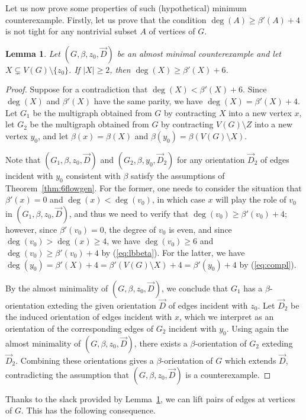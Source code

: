 \documentclass[12pt,twoside,openright,a4paper]{book}
\newtheorem{lemma}[theorem]{Lemma}
\begin{document}
Let us now prove some properties of such (hypothetical) minimum counterexample.  Firstly, let us prove that the condition $\deg(A)\ge \beta'(A)+4$
is not tight for any nontrivial subset $A$ of vertices of $G$.
\begin{lemma}\label{lemma:6fl-nontight}
Let $(G,\beta,z_0,\vec{D})$ be an almost minimal counterexample and let $X\subsetneq V(G)\setminus\{z_0\}$.  If $|X|\ge 2$,
then $\deg(X)\ge \beta'(X)+6$.
\end{lemma}
\begin{proof}
Suppose for a contradiction that $\deg(X)<\beta'(X)+6$.  Since $\deg(X)$ and $\beta'(X)$ have the same parity,
we have $\deg(X)=\beta'(X)+4$. Let $G_1$ be the multigraph obtained from $G$ by contracting $X$ into a new vertex $x$,
let $G_2$ be the multigraph obtained from $G$ by contracting $V(G)\setminus Z$ into a new vertex $y_0$, and let
$\beta(x)=\beta(X)$ and $\beta(y_0)=\beta(V(G)\setminus X)$.

Note that $(G_1,\beta,z_0,\vec{D})$ and $(G_2,\beta,y_0,\vec{D}_2)$ for any orientation $\vec{D}_2$ of edges incident with
$y_0$ consistent with $\beta$ satisfy the assumptions of Theorem~\ref{thm:6flowgen}. For the former, one needs to consider the situation that $\beta'(x)=0$
and $\deg(x)<\deg(v_0)$, in which case $x$ will play the role of $v_0$ in $(G_1,\beta,z_0,\vec{D})$, and thus we need to verify that
$\deg(v_0)\ge \beta'(v_0)+4$; however, since $\beta'(v_0)=0$, the degree of $v_0$ is even, and since $\deg(v_0)>\deg(x)\ge 4$,
we have $\deg(v_0)\ge 6$ and $\deg(v_0)\ge \beta'(v_0)+4$ by (\ref{eq:lbbeta}).  For the latter, we have
$\deg(y_0)=\beta'(X)+4=\beta'(V(G)\setminus X)+4=\beta'(y_0)+4$ by (\ref{eq:compl}).

By the almost minimality of $(G,\beta,z_0,\vec{D})$, we conclude that $G_1$ has a $\beta$-orientation exteding the given orientation $\vec{D}$
of edges incident with $z_0$.  Let $\vec{D}_2$ be the induced orientation of edges incident with $x$, which we interpret
as an orientation of the corresponding edges of $G_2$ incident with $y_0$.  Using again the almost minimality of $(G,\beta,z_0,\vec{D})$,
there exists a $\beta$-orientation of $G_2$ exteding $\vec{D}_2$.  Combining these orientations gives a $\beta$-orientation of $G$ which extends $\vec{D}$,
contradicting the assumption that $(G,\beta,z_0,\vec{D})$ is a counterexample.
\end{proof}

Thanks to the slack provided by Lemma~\ref{lemma:6fl-nontight}, we can lift pairs of edges at vertices of $G$.  This has the
following consequence.
\end{document}
